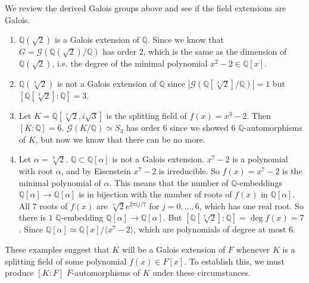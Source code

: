   \begin{example}
    We review the derived Galois groups above and see if the field extensions are Galois. 
    \begin{enumerate}
      \item $\mathbb{Q}(\sqrt{2})$ is a Galois extension of $\mathbb{Q}$. Since we know that $G = \mathcal{G}(\mathbb{Q}(\sqrt{2})/\mathbb{Q})$ has order $2$, which is the same as the dimension of $\mathbb{Q}(\sqrt{2})$, i.e. the degree of the minimal polynomial $x^2 - 2 \in \mathbb{Q}[x]$. 

      \item $\mathbb{Q}(\sqrt[3]{2})$ is not a Galois extension of $\mathbb{Q}$ since $|\mathcal{G}(\mathbb{Q}[\sqrt[3]{2}]/\mathbb{Q})| = 1$ but $[\mathbb{Q}[\sqrt[3]{2}] : \mathbb{Q}] = 3$. 

      \item Let $K = \mathbb{Q}[\sqrt[3]{2}, i \sqrt{3}]$ is the splitting field of $f(x) = x^3 - 2$. Then $[K:\mathbb{Q}] = 6$. $\mathcal{G}(K/\mathbb{Q}) \simeq S_3$ has order $6$ since we showed 6 $\mathbb{Q}$-automorphisms of $K$, but now we know that there can be no more. 

      \item Let $\alpha = \sqrt[7]{2}$. $\mathbb{Q} \subset \mathbb{Q}[\alpha]$ is not a Galois extension. $x^7 - 2$ is a polynomial with root $\alpha$, and by Eisenstein $x^7 - 2$ is irreducible. So $f(x) = x^7 - 2$ is the minimal polynomial of $\alpha$. This means that the number of $\mathbb{Q}$-embeddings $\mathbb{Q}[\alpha] \to \mathbb{Q}[\alpha]$ is in bijection with the number of roots of $f(x)$ in $\mathbb{Q}[\alpha]$. All $7$ roots of $f(x)$ are $\sqrt[7]{2} e^{2\pi i j/7}$ for $j = 0, \ldots, 6$, which has one real root. So there is $1$ $\mathbb{Q}$-embedding $\mathbb{Q}[\alpha] \to \mathbb{Q}[\alpha]$. But $[\mathbb{Q}[\sqrt[7]{2}] : \mathbb{Q}] = \deg{f(x)} = 7$. Since $\mathbb{Q}[\alpha] \simeq \mathbb{Q}[x]/{\langle x^7 - 2 \rangle}$, which are polynomials of degree at most $6$. 
    \end{enumerate}
  \end{example}

  These examples suggest that $K$ will be a Galois extension of $F$ whenever $K$ is a splitting field of some polynomial $f(x) \in F[x]$. To establish this, we must produce $[K:F]$ $F$-automorphisms of $K$ under these circumstances. 

